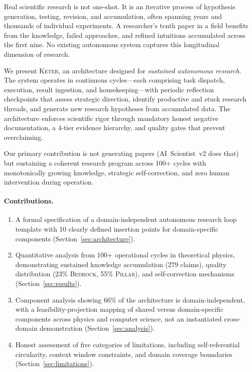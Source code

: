 \documentclass[11pt,a4paper]{article}
\newcommand{\keter}{\textsc{Keter}}
\newcommand{\bedrock}{\textsc{Bedrock}}
\newcommand{\pillar}{\textsc{Pillar}}
\begin{document}
Real scientific research is not one-shot. It is an iterative process of hypothesis
generation, testing, revision, and accumulation, often spanning years and thousands
of individual experiments. A researcher's tenth paper in a field benefits from the
knowledge, failed approaches, and refined intuitions accumulated across the first
nine. No existing autonomous system captures this longitudinal dimension of research.

We present \keter{}, an architecture designed for \emph{sustained autonomous research}.
The system operates in continuous cycles---each comprising task dispatch, execution,
result ingestion, and housekeeping---with periodic reflection checkpoints that assess
strategic direction, identify productive and stuck research threads, and generate
new research hypotheses from accumulated data. The architecture enforces scientific
rigor through mandatory honest negative documentation, a 4-tier evidence hierarchy,
and quality gates that prevent overclaiming.

Our primary contribution is not generating papers (AI~Scientist~v2 does that) but
sustaining a coherent research program across 100+ cycles with monotonically growing
knowledge, strategic self-correction, and zero human intervention during operation.

\paragraph{Contributions.}
\begin{enumerate}[nosep]
    \item A formal specification of a domain-independent autonomous research loop
          template with 10 clearly defined insertion points for domain-specific
          components (Section~\ref{sec:architecture}).
    \item Quantitative analysis from 100+ operational cycles in theoretical physics,
          demonstrating sustained knowledge accumulation (279 claims), quality
          distribution (23\% \bedrock{}, 55\% \pillar{}), and self-correction
          mechanisms (Section~\ref{sec:results}).
    \item Component analysis showing 66\% of the architecture is domain-independent,
          with a feasibility-projection mapping of shared versus domain-specific
          components across physics and computer science, not an instantiated
          cross-domain demonstration (Section~\ref{sec:analysis}).
    \item Honest assessment of five categories of limitations, including self-referential
          circularity, context window constraints, and domain coverage boundaries
          (Section~\ref{sec:limitations}).
\end{enumerate}
\end{document}
